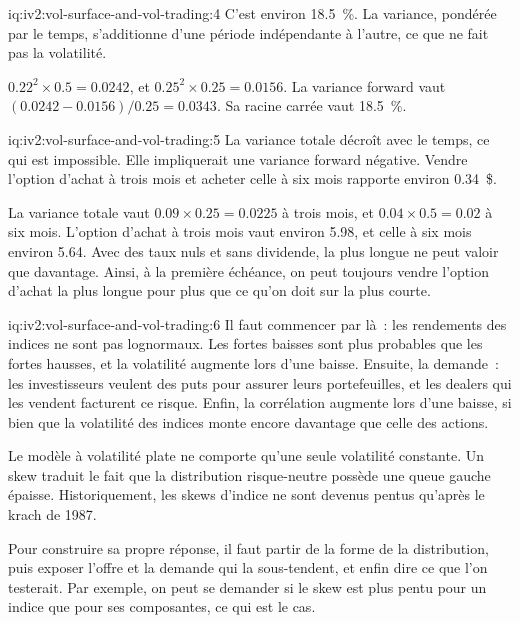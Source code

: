 \begin{solution}{iq:iv2:vol-surface-and-vol-trading:4}
C'est environ 18.5~\%. La variance, pondérée par le temps, s'additionne d'une période indépendante à l'autre, ce que ne fait pas la volatilité.

$0.22^2 \times 0.5 = 0.0242$, et $0.25^2 \times 0.25 = 0.0156$. La variance forward vaut $(0.0242 - 0.0156)/0.25 = 0.0343$. Sa racine carrée vaut 18.5~\%.

\end{solution}

\begin{solution}{iq:iv2:vol-surface-and-vol-trading:5}
La variance totale décroît avec le temps, ce qui est impossible. Elle impliquerait une variance forward négative. Vendre l'option d'achat à trois mois et acheter celle à six mois rapporte environ 0.34~\$.

La variance totale vaut $0.09 \times 0.25 = 0.0225$ à trois mois, et $0.04 \times 0.5 = 0.02$ à six mois. L'option d'achat à trois mois vaut environ 5.98, et celle à six mois environ 5.64. Avec des taux nuls et sans dividende, la plus longue ne peut valoir que davantage. Ainsi, à la première échéance, on peut toujours vendre l'option d'achat la plus longue pour plus que ce qu'on doit sur la plus courte.

\end{solution}

\begin{solution}{iq:iv2:vol-surface-and-vol-trading:6}
Il faut commencer par là~: les rendements des indices ne sont pas lognormaux. Les fortes baisses sont plus probables que les fortes hausses, et la volatilité augmente lors d'une baisse. Ensuite, la demande~: les investisseurs veulent des puts pour assurer leurs portefeuilles, et les dealers qui les vendent facturent ce risque. Enfin, la corrélation augmente lors d'une baisse, si bien que la volatilité des indices monte encore davantage que celle des actions.

Le modèle à volatilité plate ne comporte qu'une seule volatilité constante. Un skew traduit le fait que la distribution risque-neutre possède une queue gauche épaisse. Historiquement, les skews d'indice ne sont devenus pentus qu'après le krach de 1987.

Pour construire sa propre réponse, il faut partir de la forme de la distribution, puis exposer l'offre et la demande qui la sous-tendent, et enfin dire ce que l'on testerait. Par exemple, on peut se demander si le skew est plus pentu pour un indice que pour ses composantes, ce qui est le cas.

\end{solution}

